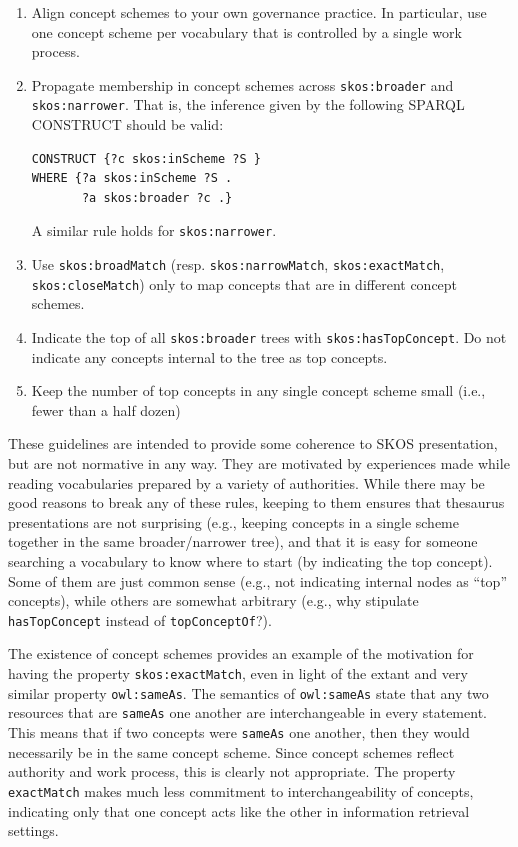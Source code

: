 \begin{enumerate}
\item Align concept schemes to your own governance practice. In particular,
use one concept scheme per vocabulary that is controlled by a single
work process.

\item Propagate membership in concept schemes across \texttt{skos:broader} and
\texttt{skos:narrower}. That
is, the inference given by the following SPARQL CONSTRUCT should be
valid:

\begin{lstlisting}
CONSTRUCT {?c skos:inScheme ?S }
WHERE {?a skos:inScheme ?S .
       ?a skos:broader ?c .}
\end{lstlisting}

A similar rule holds for \texttt{skos:narrower}.

\item Use \texttt{skos:broadMatch} (resp. \texttt{skos:narrowMatch}, \texttt{skos:exactMatch},
\texttt{skos:closeMatch}) only to map concepts that are in different concept
schemes.

\item Indicate the top of all \texttt{skos:broader} trees with \texttt{skos:hasTopConcept}.
Do not indicate any concepts internal to the tree as top concepts.

\item Keep the number of top concepts in any single concept scheme small
(i.e., fewer than a half dozen)

\end{enumerate}

These guidelines are intended to provide some coherence to SKOS
presentation, but are not normative in any way. They are motivated by
experiences made while reading vocabularies prepared by a variety of
authorities. While there may be good reasons to break any of these
rules, keeping to them ensures that thesaurus presentations are not
surprising (e.g., keeping concepts in a single scheme together in the
same broader/narrower tree), and that it is easy for someone searching a
vocabulary to know where to start (by indicating the top concept). Some
of them are just common sense (e.g., not indicating internal nodes as
``top'' concepts), while others are somewhat arbitrary (e.g., why
stipulate \texttt{hasTopConcept} instead of \texttt{topConceptOf}?).

The existence of concept schemes provides an example of the motivation
for having the property
\texttt{skos:exactMatch}, even in light of the extant and very similar property
\texttt{owl:sameAs}. The semantics of \texttt{owl:sameAs} state that any two resources
that are \texttt{sameAs} one another are interchangeable in every statement.
This means that if two concepts were \texttt{sameAs} one another, then they would
necessarily be in the same concept scheme. Since concept schemes reflect
authority and work process, this is clearly not appropriate. The
property \texttt{exactMatch} makes much less commitment to interchangeability of
concepts, indicating only that one concept acts like the other in
information retrieval settings.

